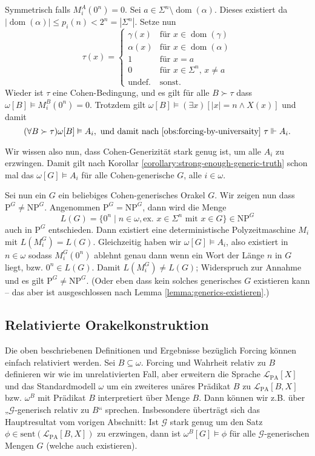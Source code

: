 \documentclass[nofonts]{uebung}
\theoremstyle{definition}
\def\P{\ensuremath{\mathrm{P}}}
\def\NP{\ensuremath{\mathrm{NP}}}
\DeclareMathOperator{\dom}{dom}
\begin{document}
Symmetrisch falls $M_i^A(0^n)=0$. Sei $a\in \Sigma^n\setminus\dom(\alpha)$. Dieses existiert da $|\dom(\alpha)|\leq p_i(n)<2^n=|\Sigma^n|$. Setze nun
\[ \tau(x) =\begin{cases} \gamma(x) & \text{für $x\in\dom(\gamma)$}\\\alpha(x) & \text{für $x\in\dom(\alpha)$}\\1&\text{für $x=a$}\\0&\text{für $x\in\Sigma^n$, $x\neq a$}\\\text{undef.} & \text{sonst}.\end{cases} \]
Wieder ist $\tau$ eine Cohen-Bedingung, und es gilt für alle $B\succ \tau$ dass $\omega[B] \vDash M_i^B(0^n)=0$.
Trotzdem gilt $\omega[B] \vDash (\exists x)[|x|=n\land X(x)]$ und damit
\[ (\forall B\succ \tau) \omega[B] \vDash A_i, \text{ und damit nach \ref{obs:forcing-by-universaity} } \tau\Vdash A_i. \]

Wir wissen also nun, dass Cohen-Generizität stark genug ist, um alle $A_i$ zu erzwingen. Damit gilt nach Korollar \ref{corollary:strong-enough-generic-truth} schon mal das $\omega[G]\vDash A_i$ für alle Cohen-generische $G$, alle $i\in\omega$.

Sei nun ein $G$ ein beliebiges Cohen-generisches Orakel $G$. Wir zeigen nun dass $\P^G\neq\NP^G$. Angenommen $\P^G=\NP^G$, dann wird die Menge
\[ L(G) = \{ 0^n \mid n\in\omega, \text{ex. $x\in\Sigma^n$ mit $x\in G$} \} \in\NP^G \]
auch in $\P^G$ entschieden.
Dann existiert eine deterministische Polyzeitmaschine $M_i$ mit $L(M_i^G)=L(G)$.
Gleichzeitig haben wir $\omega[G]\vDash A_i$, also existiert in $n\in\omega$ sodass $M_i^G(0^n)$ ablehnt genau dann wenn ein Wort der Länge $n$ in $G$ liegt, bzw. $0^n\in L(G)$. 
Damit $L(M_i^G)\neq L(G)$; Widerspruch zur Annahme und es gilt $\P^G\neq\NP^G$. (Oder eben dass kein solches generisches $G$ existieren kann -- das aber ist ausgeschlossen nach Lemma \ref{lemma:generics-existieren}.)

\subsection{Relativierte Orakelkonstruktion}

Die oben beschriebenen Definitionen und Ergebnisse bezüglich Forcing können einfach relativiert werden. Sei $B\subseteq \omega$. Forcing und Wahrheit relativ zu $B$ definieren wir wie im unrelativierten Fall, aber erweitern die Sprache $\mathcal L_{\mathrm{PA}}[X]$ und das Standardmodell $\omega$ um ein zweiteres unäres Prädikat $B$ zu $\mathcal L_{\mathrm{PA}}[B,X]$ bzw. $\omega^B$ mit Prädikat $B$ interpretiert über Menge $B$. Dann können wir z.B. über „$\mathcal G$-generisch relativ zu $B$“ sprechen.
Insbesondere überträgt sich das Hauptresultat vom vorigen Abschnitt: Ist $\mathcal G$ stark genug um den Satz $\phi\in \mathrm{sent}(\mathcal L_{\mathrm{PA}}[B,X])$ zu erzwingen, dann ist $\omega^B[G]\vDash \phi$ für alle $\mathcal G$-generischen Mengen $G$ (welche auch existieren).
\end{document}
